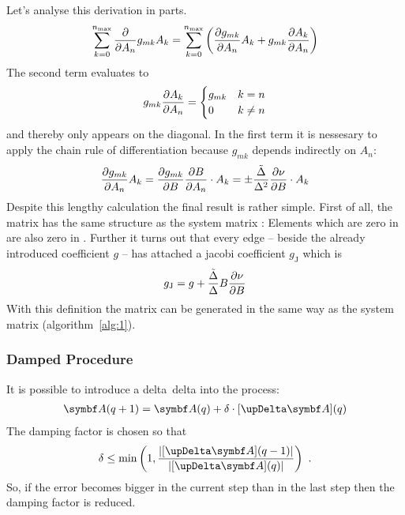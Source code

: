 Let's analyse this derivation in parts.
\begin{gather}
  \label{eq:26}
  \sum_{k=0}^{n_{\text{max}}}\frac{\partial}{\partial A_n}g_{mk}A_k
  =\sum_{k=0}^{n_{\text{max}}}\left(\frac{\partial g_{mk}}{\partial A_n}A_k
    +g_{mk}\frac{\partial A_k}{\partial A_n}\right)
\end{gather}
The second term evaluates to
\begin{gather}
  \label{eq:27}
  g_{mk}\frac{\partial A_k}{\partial A_n}=
  \begin{cases}
    g_{mk} & k = n \\
    0     & k \ne n
  \end{cases}
\end{gather}
and thereby only appears on the diagonal.  In the first term it is
nessesary to apply the chain rule of differentiation because $g_{mk}$
depends indirectly on $A_n$:
\begin{gather}
  \label{eq:28}
  \frac{\partial g_{mk}}{\partial A_n}A_k=\frac{\partial g_{mk}}{\partial B}\frac{\partial B}{\partial A_n}\cdot
  A_k=\pm\frac{\tilde{\Delta}}{\Delta^2}\frac{\partial\nu}{\partial B}\cdot A_k
\end{gather}
Despite this lengthy calculation the final result is rather simple.
First of all, the  matrix has the same structure as
the system matrix :  Elements which are zero in  are also zero
in \jacmatr.
Further it turns out that every edge -- beside the already introduced
coefficient $g$ -- has attached a jacobi coefficient $g_{\mathrm{J}}$ which is
\begin{gather}
  \label{eq:11}
  g_{\mathrm{J}}=g+\frac{\tilde{\Delta}}{\Delta}B\frac{\partial\nu}{\partial B}
\end{gather}
With this definition the  matrix can be generated
in the same way as the system matrix (algorithm~\ref{alg:1}).

\subsubsection{Damped  Procedure}
\label{sec:damp-newt-proc}

It is possible to introduce a \glsdesc{delta}~\gls{delta} into the
 process:
\begin{gather}
  \label{eq:30}
  \vect{A}(q+1)=\vect{A}(q)+\delta\cdot[\upDelta\vect{A}](q)
\end{gather}
The damping factor is chosen so that
\begin{gather}
  \label{eq:31}
  \delta\le\min\left(1,
    \frac{\vectnorm{[\upDelta\vect{A}](q-1)}}{\vectnorm{[\upDelta\vect{A}](q)}}\right)\text{~.}
\end{gather}
So, if the error becomes bigger in the current step than in the last
step then the damping factor is reduced.

